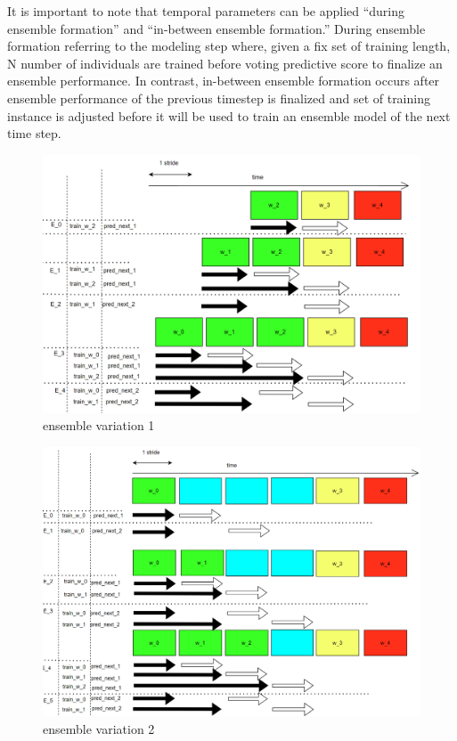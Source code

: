 \documentclass{IEEEtran}
\begin{document}
It is important to note that temporal parameters can be applied ``during ensemble formation'' and ``in-between ensemble formation.'' During ensemble formation referring to the modeling step where, given a fix set of training length, N number of individuals are trained before voting predictive score to finalize an ensemble performance. In contrast, in-between ensemble formation occurs after ensemble performance of the previous timestep is finalized and set of training instance is adjusted before it will be used to train an ensemble model of the next time step.

\begin{figure}[htbp]
\centering
\includegraphics[width=.9\linewidth]{./images/screenshot_20220321_124235.png}
\caption{\label{ensemble_variation_1}ensemble variation 1}
\end{figure}

\begin{figure}[htbp]
\centering
\includegraphics[width=.9\linewidth]{./images/screenshot_20220321_124707.png}
\caption{\label{ensemble_variation_2}ensemble variation 2}
\end{figure}
\end{document}
